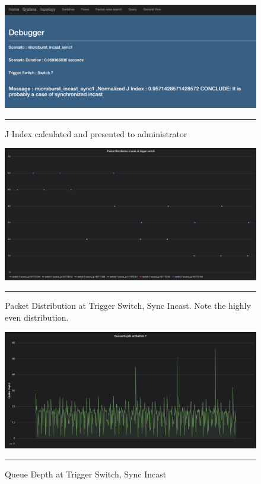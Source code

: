 \begin{figure}[htbp]
	\centering
		\includegraphics[width=1.0\columnwidth]{Figures/jindex_sync.png}
		\rule{35em}{0.5pt}
	\caption[Debugger Home Page, Synchronous Incast]{J Index calculated and presented to administrator}
	\label{fig:jind_sync}
\end{figure}

\begin{figure}[htbp]
	\centering
		\includegraphics[width=1.0\columnwidth]{Figures/distribution_sync.png}
		\rule{35em}{0.5pt}
	\caption[Packet Distribution at Trigger Switch, Sync Incast]{Packet Distribution at Trigger Switch, Sync Incast. Note the highly even distribution.}
	\label{fig:distribution_sync}
\end{figure}

\begin{figure}[htbp]
	\centering
		\includegraphics[width=1.0\columnwidth]{Figures/queue_depth_sync.png}
		\rule{35em}{0.5pt}
	\caption[Queue Depth at Trigger Switch, Sync Incast]{Queue Depth at Trigger Switch, Sync Incast}
	\label{fig:queue_depth_sync}
\end{figure}

